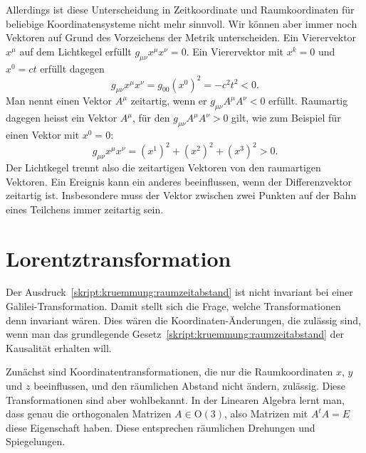 Allerdings ist diese Unterscheidung in Zeitkoordinate und Raumkoordinaten
für beliebige Koordinatensysteme nicht mehr sinnvoll.
Wir können aber immer noch Vektoren auf Grund des Vorzeichens der 
Metrik unterscheiden.
Ein Vierervektor $x^\mu$ auf dem Lichtkegel erfüllt $g_{\mu\nu}x^\mu x^\nu=0$.
Ein Vierervektor  mit $x^k=0$ und $x^0=ct$ erfüllt dagegen
\[
g_{\mu\nu} x^\mu x^\nu
=
g_{00}(x^0)^2 = -c^2 t^2<0.
\]
Man nennt einen Vektor $A^\mu$ zeitartig, wenn er $g_{\mu\nu}A^\mu A^\nu<0$ 
erfüllt.
Raumartig dagegen heisst ein Vektor $A^\mu$, für den
$g_{\mu\nu} A^\mu A^\nu>0$
gilt, wie zum Beispiel für einen Vektor mit $x^0=0$:
\[
g_{\mu\nu}x^\mu x^\nu
=
(x^1)^2
+
(x^2)^2
+
(x^3)^2
>0.
\]
Der Lichtkegel trennt also die zeitartigen Vektoren von den raumartigen
Vektoren.
Ein Ereignis kann ein anderes beeinflussen, wenn der Differenzvektor
zeitartig ist.
Insbesondere muss der Vektor zwischen zwei Punkten auf der Bahn 
eines Teilchens immer zeitartig sein.

\section{Lorentztransformation}
\label{chap:lorentz}
Der Ausdruck~\eqref{skript:kruemmung:raumzeitabstand} ist nicht
invariant bei einer Galilei-Transformation.
Damit stellt sich die Frage, welche Transformationen denn
invariant wären.
Dies wären die Koordinaten-Änderungen, die zulässig sind, wenn
man das grundlegende Gesetz~\eqref{skript:kruemmung:raumzeitabstand}
der Kausalität erhalten will.

Zunächst sind Koordinatentransformationen, die nur die Raumkoordinaten
$x$, $y$ und $z$ beeinflussen, und den räumlichen Abstand nicht
ändern, zulässig.
Diese Transformationen sind aber wohlbekannt.
In der Linearen Algebra lernt man, dass genau die orthogonalen
Matrizen $A\in \textrm{O}(3)$, also Matrizen mit $A^tA=E$ diese
Eigenschaft haben.
Diese entsprechen räumlichen Drehungen und Spiegelungen.

